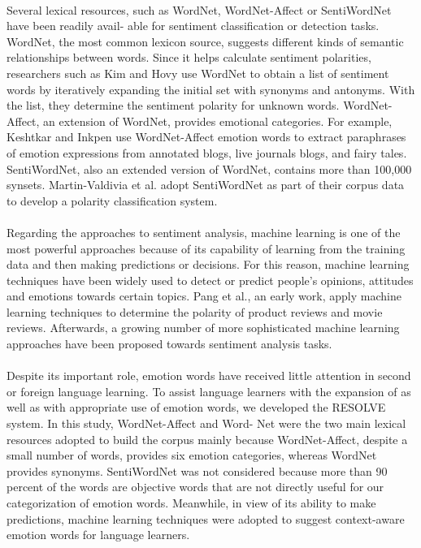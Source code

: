\documentclass[a4paper,12pt,oneside]{article}
\begin{document}
\paragraph{}
Several lexical resources, such as WordNet, WordNet-Affect or SentiWordNet  have been readily avail- able for sentiment classification or detection tasks. WordNet, the most common lexicon source, suggests different kinds of semantic relationships between words. Since it helps calculate sentiment polarities, researchers such as Kim and Hovy use WordNet to obtain a list of sentiment words by iteratively expanding the initial set with synonyms and antonyms. With the list, they determine the sentiment polarity for unknown words. WordNet-Affect, an extension of WordNet, provides emotional categories. For example, Keshtkar and Inkpen  use WordNet-Affect emotion words to extract paraphrases of emotion expressions from annotated blogs, live journals blogs, and fairy tales. SentiWordNet, also an extended version of WordNet, contains more than 100,000 synsets. Martin-Valdivia et al. adopt SentiWordNet as part of their corpus data to develop a polarity classification system.
\paragraph{}
Regarding the approaches to sentiment analysis, machine learning is one of the most powerful approaches because of its capability of learning from the training data and then making predictions or decisions. For this reason, machine learning techniques have been widely used to detect or predict people’s opinions, attitudes and emotions towards certain topics. Pang et al., an early work, apply machine learning techniques to determine the polarity of product reviews and movie reviews. Afterwards, a growing number of more sophisticated machine learning approaches have been proposed towards sentiment analysis tasks.
\paragraph{}
Despite its important role, emotion words have received little attention in second or foreign language learning. To assist language learners with the expansion of as well as with appropriate use of emotion words, we developed the RESOLVE system. In this study, WordNet-Affect and Word- Net were the two main lexical resources adopted to build the corpus mainly because WordNet-Affect, despite a small number of words, provides six emotion categories, whereas WordNet provides synonyms. SentiWordNet was not considered because more than 90 percent of the words are objective words that are not directly useful for our categorization of emotion words. Meanwhile, in view of its ability to make predictions, machine learning techniques were adopted to suggest context-aware emotion words for language learners.
\end{document}
